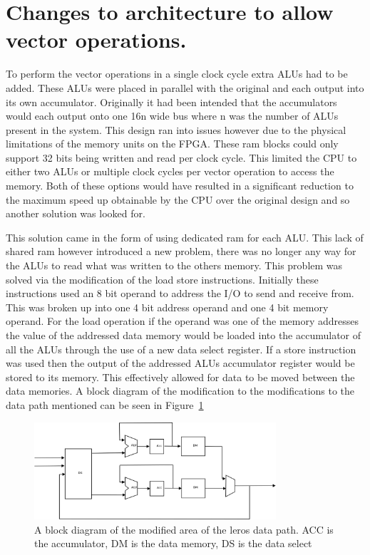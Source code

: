 \section{Changes to architecture to allow vector operations.}

To perform the vector operations in a single clock cycle extra ALUs had to be added. These ALUs were placed in parallel with the original and each output into its own accumulator. Originally it had been intended that the accumulators would each output onto one 16n wide bus where n was the number of ALUs present in the system. This design ran into issues however due to the physical limitations of the memory units on the FPGA. These ram blocks could only support 32 bits being written and read per clock cycle. This limited the CPU to either two ALUs or multiple clock cycles per vector operation to access the memory. Both of these options would have resulted in a significant reduction to the maximum speed up obtainable by the CPU over the original design and so another solution was looked for.

This solution came in the form of using dedicated ram for each ALU. This lack of shared ram however introduced a new problem, there was no longer any way for the ALUs to read what was written to the others memory. This problem was solved via the modification of the load store instructions. Initially these instructions used an 8 bit operand to address the I/O to send and receive from. This was broken up into one 4 bit address operand and one 4 bit memory operand. For the load operation if the operand was one of the memory addresses the value of the addressed data memory would be loaded into the accumulator of all the ALUs through the use of a new data select register. If a store instruction was used then the output of the addressed ALUs accumulator register would be stored to its memory. This effectively allowed for data to be moved between the data memories. A block diagram of the modification to the modifications to the data path mentioned can be seen in Figure~\ref{new_path}

\begin{figure}[ht]
	\begin{center}
		\includegraphics[width=0.8\textwidth]{images/new_path}
	\end{center}
	\caption{A block diagram of the modified area of the leros data path. ACC is the accumulator, DM is the data memory, DS is the data select}
	\label{new_path}
\end{figure}

